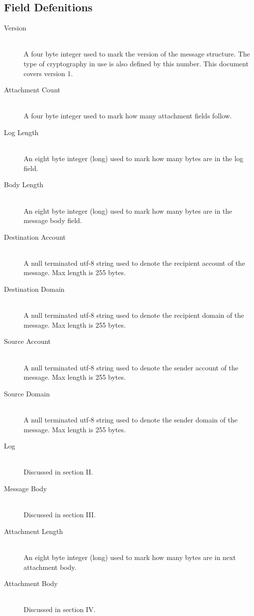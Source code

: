 \documentclass[a4paper,11pt]{IEEEtran}
\begin{document}
\subsection{Field Defenitions}
\begin{description}
  \item[Version] \hfill \\ A four byte integer used to mark the version of the message structure. The type of cryptography in use is also defined by this number. This document covers version 1.
  \item[Attachment Count] \hfill \\ A four byte integer used to mark how many attachment fields follow.
  \item[Log Length] \hfill \\ An eight byte integer (long) used to mark how many bytes are in the log field.
  \item[Body Length] \hfill \\  An eight byte integer (long) used to mark how many bytes are in the message body field.
  \item[Destination Account] \hfill \\ A null terminated utf-8 string used to denote the recipient account of the message. Max length is 255 bytes.
  \item[Destination Domain] \hfill \\ A null terminated utf-8 string used to denote the recipient domain of the message. Max length is 255 bytes.
  \item[Source Account] \hfill \\ A null terminated utf-8 string used to denote the sender account of the message. Max length is 255 bytes.
  \item[Source Domain] \hfill \\ A null terminated utf-8 string used to denote the sender domain of the message. Max length is 255 bytes.
  \item[Log] \hfill \\ Discussed in section II.
  \item[Message Body] \hfill \\ Discussed in section III.
  \item[Attachment Length] \hfill \\ An eight byte integer (long) used to mark how many bytes are in next attachment body.
  \item[Attachment Body] \hfill \\ Discussed in section IV.
  
\end{description}
\end{document}
